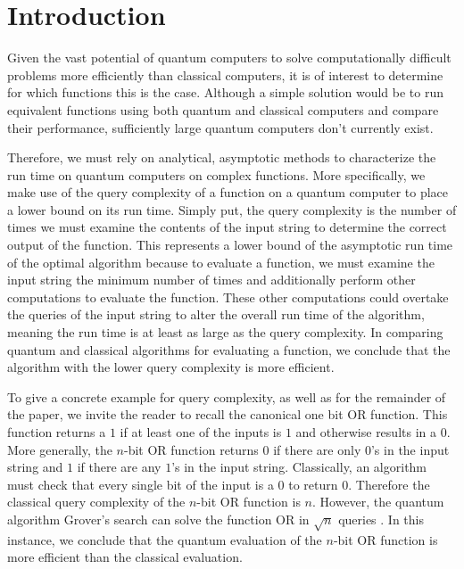 \section{Introduction}

Given the vast potential of quantum computers to solve
computationally difficult problems more efficiently
than classical computers, it is of interest to
determine for which functions this is the case. Although a
simple solution would be to run equivalent functions using
both quantum and classical computers and compare their
performance, sufficiently large quantum computers don't
currently exist.

Therefore, we must rely on analytical, asymptotic methods
to characterize the run time on quantum computers on
complex functions. More specifically, we make use of the
query complexity of a function on a quantum computer to
place a lower bound on its run time. Simply put, the query
complexity is the number of times we must examine the
contents of the input string to determine the correct
output of the function. This represents a lower bound of
the asymptotic run time of the optimal algorithm because to
evaluate a function, we must examine the input string the
minimum number of times and additionally perform other
computations to evaluate the function. These other
computations could overtake the queries of the input string
to alter the overall run time of the algorithm, meaning the
run time is at least as large as the query complexity. In comparing quantum and classical algorithms for evaluating a function, we conclude that the algorithm with the lower query complexity is more efficient.

To give a concrete example for query complexity, as well as
for the remainder of the paper, we invite the reader to
recall the canonical one bit OR function. This function
returns a $1$ if at least one of the inputs is $1$ and
otherwise results in a $0$. More generally, the $n$-bit OR
function returns $0$ if there are only $0$'s in the input
string and $1$ if there are any $1$'s in the input string.
Classically, an algorithm must check that
every single bit of the input is a $0$ to return $0$.
Therefore the classical query complexity of the $n$-bit OR
function is $n$. However, the quantum algorithm Grover's
search can solve the function OR in $\sqrt{n}$ queries
\cite{grover1996fast}. In this instance, we conclude that
the quantum evaluation of the $n$-bit OR function is more
efficient than the classical evaluation.

